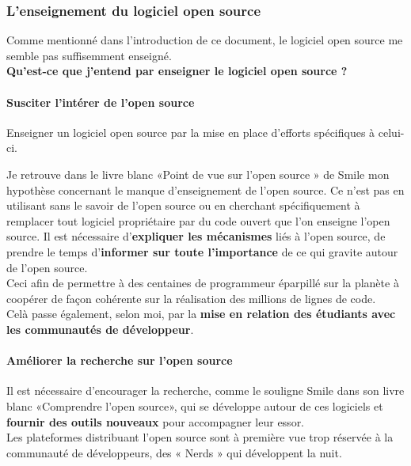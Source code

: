 			\subsubsection{L'enseignement du logiciel open source}

				Comme mentionné dans l'introduction de ce document, le logiciel open source me semble pas suffisemment enseigné.\\

				\textbf{Qu'est-ce que j'entend par enseigner le logiciel open source ?}

				\paragraph{Susciter l'intérer de l'open source\\}

					Enseigner un logiciel open source par la mise en place d'efforts spécifiques à celui-ci. 

					Je retrouve dans le livre blanc «Point de vue sur l'open source » de Smile mon hypothèse concernant le manque d'enseignement de l'open source. Ce n'est pas en utilisant sans le savoir de l'open source ou en cherchant spécifiquement à remplacer tout logiciel propriétaire par du code ouvert que l'on enseigne l'open source. Il est nécessaire d'\textbf{expliquer les mécanismes} liés à l'open source, de prendre le temps d'\textbf{informer sur toute l'importance} de ce qui gravite autour de l'open source.\\
					Ceci afin de permettre à des centaines de programmeur éparpillé sur la planète à coopérer de façon cohérente sur la réalisation des millions de lignes de code.\\

					Celà passe également, selon moi, par la \textbf{mise en relation des étudiants avec les communautés de développeur}.

				\paragraph{Améliorer la recherche sur l'open source\\}

					Il est nécessaire d'encourager la recherche, comme le souligne Smile dans son livre blanc «Comprendre l'open source», qui se développe autour de ces logiciels et \textbf{fournir des outils nouveaux} pour accompagner leur essor.\\

					Les plateformes distribuant l'open source sont à première vue trop réservée à la communauté de développeurs, des « Nerds » qui développent la nuit.

